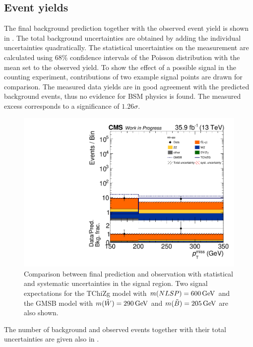 \subsection{Event yields}
The final background prediction together with the observed event yield is shown in .
The total background uncertainties are obtained by adding the individual uncertainties quadratically. The statistical uncertainties on the measurement are calculated using $68\%$ confidence intervals of the Poisson distribution with the mean set to the observed yield.
To show the effect of a possible signal in the counting experiment, contributions of two example signal points are drawn for comparison. The measured data yields are in good agreement with the predicted background events, thus no evidence for BSM physics is found. The measured excess corresponds to a significance of $1.26\sigma$.
\begin{figure}[tbp]
 \centering
 \includegraphics[width=\pairwidth]{figures/UnblindingPlots/final_MC_log}
 \caption{Comparison between final prediction and observation with statistical and systematic uncertainties in the signal region. Two signal expectations for the TChiZg model with $m(NLSP)=600\,\text{Ge\hspace{-.08em}V}$ and the GMSB model with $m(\tilde{W})=290\,\text{Ge\hspace{-.08em}V}$ and $m(\tilde{B})=205\,\text{Ge\hspace{-.08em}V}$ are also shown.}
 \label{fig:result}
\end{figure}
The number of background and observed events together with their total uncertainties are given also in .
